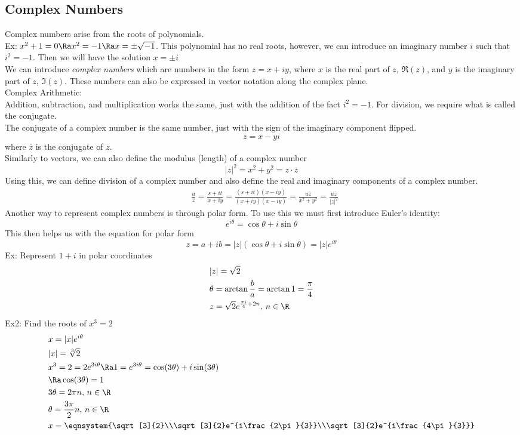 \subsection{Complex Numbers}
Complex numbers arise from the roots of polynomials.\\
Ex: $x^2+1=0\Ra x^2=-1 \Ra x=\pm\sqrt{-1}$. This polynomial has no real roots, however, we can introduce an imaginary number $i$ such that $i^2=-1$. Then we will have the solution $x=\pm i$\\
We can introduce \textit{complex numbers} which are numbers in the form $z=x+iy$, where $x$ is the real part of $z$, $\Re(z)$, and $y$ is the imaginary part of $z$, $\Im(z)$. 
These numbers can also be expressed in vector notation along the complex plane.\\
Complex Arithmetic:\\
Addition, subtraction, and multiplication works the same, just with the addition of the fact $i^2=-1$. For division, we require what is called the conjugate.\\
The conjugate of a complex number is the same number, just with the sign of the imaginary component flipped.
$$\overline{z}=x-yi$$
where $\overline{z}$ is the conjugate of $z$.\\
Similarly to vectors, we can also define the modulus (length) of a complex number
$$|z|^2=x^2+y^2=z\cdot\overline{z}$$
Using this, we can define division of a complex number and also define the real and imaginary components of a complex number.
\begin{align*}
    &\frac{u}{z}=\frac{s+it}{x+iy}=\frac{(s+it)(x-iy)}{(x+iy)(x-iy)}=\frac{u\overline{z}}{x^2+y^2}=\frac{u\overline{z}}{|z|^2}
\end{align*}
Another way to represent complex numbers is through polar form. To use this we must first introduce Euler's identity:
$$e^{i\theta}=\cos\theta+i\sin\theta$$
This then helps us with the equation for polar form
$$z=a+ib=|z|(\cos\theta+i\sin\theta)=|z|e^{i\theta}$$
Ex: Represent $1+i$ in polar coordinates
\begin{align*}
    &|z|=\sqrt{2}\\
    &\theta=\arctan{\frac{b}{a}}=\arctan{1}=\frac{\pi}{4}\\
    &z=\sqrt{2}e^{\frac{\pi i}{4}+2n},\,n\in\R
\end{align*}
Ex2: Find the roots of $x^3=2$
\begin{align*}
    &x=|x|e^{i\theta}\\
    &|x|=\sqrt[3]{2}\\
    &x^3=2=2e^{3i\theta}\Ra 1=e^{3i\theta}=\cos(3\theta)+i\sin(3\theta)\\
    &\Ra \cos(3\theta)=1\\
    &3\theta=2\pi n,\,n\in\R\\
    &\theta=\frac{3\pi}{2}n,\,n\in\R\\
    &x=\eqnsystem{\sqrt[3]{2}\\\sqrt[3]{2}e^{i\frac{2\pi}{3}}\\\sqrt[3]{2}e^{i\frac{4\pi}{3}}}
\end{align*}